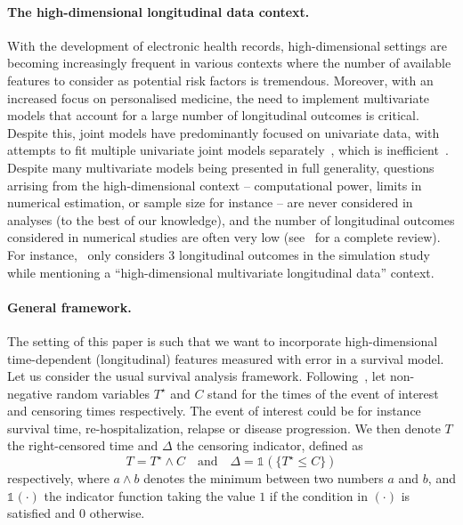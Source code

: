 \documentclass[11pt]{article}
\newcommand{\ind}[1]{\mathds{1}_{#1}}
\begin{document}
\paragraph{The high-dimensional longitudinal data context.}
With the development of electronic health records, high-dimensional settings are becoming increasingly frequent in various contexts where the number of available features to consider as potential risk factors is tremendous.
Moreover, with an increased focus on personalised medicine, the need to implement multivariate models that account for a large number of longitudinal outcomes is critical. Despite this, joint models have predominantly focused on univariate data, with attempts to fit multiple univariate joint models separately~\citep{wang2012joint}, which is inefficient~\citep{lin2002maximum}. 
Despite many multivariate models being presented in full generality, questions arrising from the high-dimensional context -- computational power, limits in numerical estimation, or sample size for instance -- are never considered in analyses (to the best of our knowledge), and the number of longitudinal outcomes considered in numerical studies are often very low (see~\citet{hickey2016joint} for a complete review). For instance,~\citet{jaffa2014joint} only considers 3 longitudinal outcomes in the simulation study while mentioning a ``high-dimensional multivariate longitudinal data'' context.


\paragraph{General framework.}

The setting of this paper is such that we want to incorporate high-dimensional time-dependent (longitudinal) features measured with error in a survival model. Let us consider the usual survival analysis framework.
Following~\citet{AndBorGilKei-93}, let non-negative random variables $T^\star$ and $C$ stand for the times of the event of interest and censoring times respectively. The event of interest could be for instance survival time, re-hospitalization, relapse or disease progression.
We then denote $T$ the right-censored time and $\Delta$ the censoring indicator, defined as 
\begin{equation*}
T = T^\star \wedge C \quad \text{and} \quad \Delta = \ind{}({\{T^\star \leq C\}})
\end{equation*}
respectively, where $a \wedge b$ denotes the minimum between two numbers $a$ and $b$, and $\ind{}(\cdot)$ the indicator function taking the value $1$ if the condition in $(\cdot)$ is satisfied and $0$ otherwise.
\end{document}
